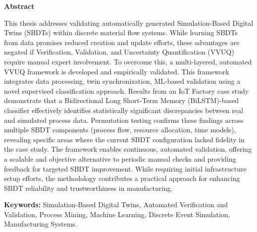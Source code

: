 \thispagestyle{plain} %

\vspace*{1.5in} %

\begin{center}
  {\Large \textbf{Abstract}}
\end{center}

This thesis addresses validating automatically generated Simulation-Based Digital Twins (SBDTs) within discrete material flow systems. While learning SBDTs from data promises reduced creation and update efforts, these advantages are negated if Verification, Validation, and Uncertainty Quantification (VVUQ) require manual expert involvement. To overcome this, a multi-layered, automated VVUQ framework is developed and empirically validated. This framework integrates data processing, twin synchronization, ML-based validation using a novel supervised classification approach. Results from an IoT Factory case study demonstrate that a Bidirectional Long Short-Term Memory (BiLSTM)-based classifier effectively identifies statistically significant discrepancies between real and simulated process data. Permutation testing confirms these findings across multiple SBDT components (process flow, resource allocation, time models), revealing specific areas where the current SBDT configuration lacked fidelity in the case study. The framework enables continuous, automated validation, offering a scalable and objective alternative to periodic manual checks and providing feedback for targeted SBDT improvement. While requiring initial infrastructure setup efforts, the methodology contributes a practical approach for enhancing SBDT reliability and trustworthiness in manufacturing.
\medskip

\textbf{Keywords:} Simulation-Based Digital Twins, Automated Verification and Validation, Process Mining, Machine Learning, Discrete Event Simulation, Manufacturing Systems.

\clearpage